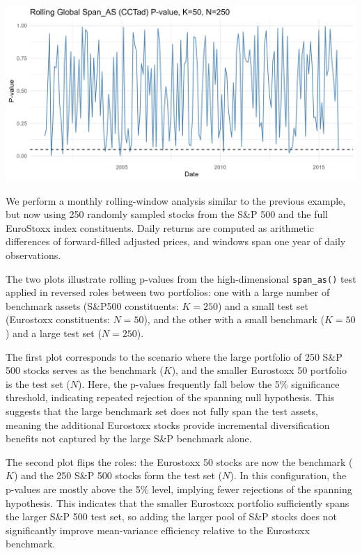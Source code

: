 \begin{center}\includegraphics[width=1\linewidth]{figures/fig_as_pvals_bigN_smallK} \end{center}

We perform a monthly rolling-window analysis similar to the previous
example, but now using 250 randomly sampled stocks from the S\&P 500 and
the full EuroStoxx index constituents. Daily returns are computed as
arithmetic differences of forward-filled adjusted prices, and windows
span one year of daily observations.

The two plots illustrate rolling p-values from the high-dimensional
\texttt{span\_as()} test applied in reversed roles between two portfolios: one
with a large number of benchmark assets (S\&P500 constituents: \(K=250\))
and a small test set (Eurostoxx constituents: \(N=50\)), and the other
with a small benchmark (\(K=50\)) and a large test set (\(N=250\)).

The first plot corresponds to the scenario where the large portfolio of
250 S\&P 500 stocks serves as the benchmark (\(K\)), and the smaller
Eurostoxx 50 portfolio is the test set (\(N\)). Here, the p-values
frequently fall below the 5\% significance threshold, indicating repeated
rejection of the spanning null hypothesis. This suggests that the large
benchmark set does not fully span the test assets, meaning the
additional Eurostoxx stocks provide incremental diversification benefits
not captured by the large S\&P benchmark alone.

The second plot flips the roles: the Eurostoxx 50 stocks are now the
benchmark (\(K\)) and the 250 S\&P 500 stocks form the test set (\(N\)). In
this configuration, the p-values are mostly above the 5\% level, implying
fewer rejections of the spanning hypothesis. This indicates that the
smaller Eurostoxx portfolio sufficiently spans the larger S\&P 500 test
set, so adding the larger pool of S\&P stocks does not significantly
improve mean-variance efficiency relative to the Eurostoxx benchmark.

